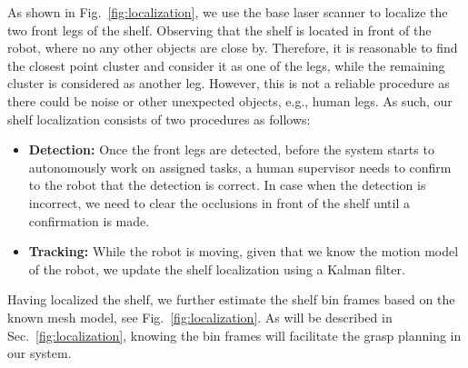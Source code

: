 As shown in Fig.~\ref{fig:localization}, we use the base laser scanner to localize the two front legs of the shelf. Observing that the shelf is located in front of the robot, where no any other objects are close by. Therefore, it is reasonable to find the closest point cluster and consider it as one of the legs, while the remaining cluster is considered as another leg. However, this is not a reliable procedure as there could be noise or other unexpected objects, e.g., human legs. As such, our shelf localization consists of two procedures as follows:

\begin{itemize}
 \item \textbf{Detection:} Once the front legs are detected, before the system starts to autonomously work on assigned tasks, a human supervisor needs to confirm to the robot that the detection is correct. In case when the detection is incorrect, we need to clear the occlusions in front of the shelf until a confirmation is made.
 \item \textbf{Tracking:} While the robot is moving, given that we know the motion model of the robot, we update the shelf localization using a Kalman filter.
\end{itemize}

Having localized the shelf, we further estimate the shelf bin frames based on the known mesh model, see Fig.~\ref{fig:localization}. As will be described in Sec.~\ref{fig:localization}, knowing the bin frames will facilitate the grasp planning in our system.
